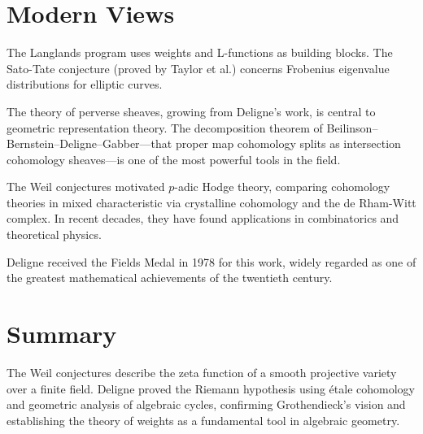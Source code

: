 \section*{Modern Views}

The Langlands program uses weights and L-functions as building blocks.
The Sato-Tate conjecture (proved by Taylor et al.) concerns Frobenius
eigenvalue distributions for elliptic curves.

The theory of perverse sheaves, growing from Deligne's work, is central to
geometric representation theory. The decomposition theorem of
Beilinson--Bernstein--Deligne--Gabber---that proper map cohomology splits
as intersection cohomology sheaves---is one of the most powerful tools in
the field.

The Weil conjectures motivated $p$-adic Hodge theory, comparing
cohomology theories in mixed characteristic via crystalline cohomology
and the de Rham-Witt complex. In recent decades, they have found
applications in combinatorics and theoretical physics.

Deligne received the Fields Medal in 1978 for this work, widely regarded
as one of the greatest mathematical achievements of the twentieth century.

\section*{Summary}
The Weil conjectures describe the zeta function of a smooth projective
variety over a finite field. Deligne proved the Riemann hypothesis using
\'etale cohomology and geometric analysis of algebraic cycles, confirming
Grothendieck's vision and establishing the theory of weights as a
fundamental tool in algebraic geometry.

